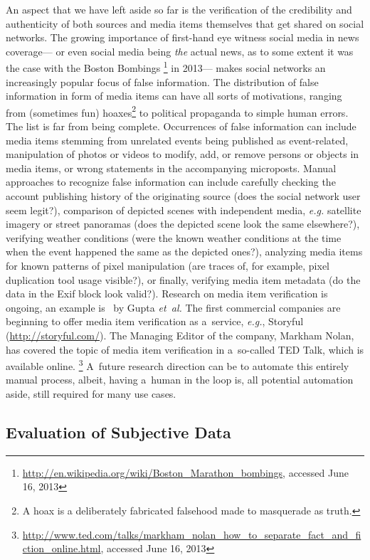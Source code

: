 An aspect that we have left aside so far is the verification
of the credibility and authenticity of both sources
and media items themselves that get shared on social networks.
The growing importance of first-hand eye witness social media in news coverage---%
or even social media being \emph{the} actual news,
as to some extent it was the case with the Boston Bombings%
\footnote{\url{http://en.wikipedia.org/wiki/Boston_Marathon_bombings},
accessed June 16, 2013} in 2013---%
makes social networks an increasingly popular focus of false information.
The distribution of false information in form of media items
can have all sorts of motivations, ranging from (sometimes fun)
hoaxes\footnote{A hoax is a deliberately fabricated falsehood made to masquerade as truth.}
to political propaganda to simple human errors.
The list is far from being complete.
Occurrences of false information can include
media items stemming from unrelated events being published as event-related,
manipulation  of photos or videos to modify, add, or remove persons or objects in media items,
or wrong statements in the accompanying microposts.
Manual approaches to recognize false information 
can include carefully checking the account publishing history
of the originating source (does the social network user seem legit?),
comparison of depicted scenes with independent media,
\emph{e.g.} satellite imagery or street panoramas
(does the depicted scene look the same elsewhere?),
verifying weather conditions
(were the known weather conditions at the time
when the event happened the same as the depicted ones?),
analyzing media items for known patterns of pixel manipulation
(are traces of, for example, pixel duplication tool usage visible?),
or finally, verifying media item metadata
(do the data in the Exif block look valid?).
Research on media item verification is ongoing,
an example is~\cite{gupta2013fakingsandy} by Gupta \emph{et~al.}
The first commercial companies are beginning to offer media item 
verification as a~service, \emph{e.g.}, Storyful (\url{http://storyful.com/}).
The Managing Editor of the company, Markham Nolan,
has covered the topic of media item verification
in a~so-called TED Talk, which is available online.%
\footnote{\url{http://www.ted.com/talks/markham_nolan_how_to_separate_fact_and_fiction_online.html},
accessed June 16, 2013}
A~future research direction can be to automate
this entirely manual process, albeit, having a~human in the loop
is, all potential automation aside, still required for many use cases.

\subsection{Evaluation of Subjective Data}

